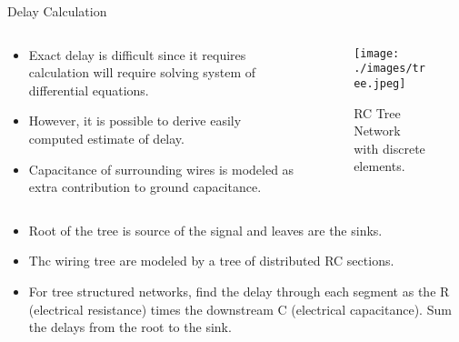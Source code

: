 \documentclass[10pt,sans,serif,trans]{beamer}
\begin{document}
\begin{frame}{Delay Calculation}
\begin{columns}[t] %
\begin{column}[T]{7cm} %
\begin{itemize}
  \item \color{red}Exact delay is difficult since it requires calculation will require solving
system of differential equations. \color{black}
    \item However, it is possible to derive easily computed estimate of delay.
     \item Capacitance of surrounding wires is modeled as extra contribution to ground capacitance.
   
 \end{itemize}
\end{column}

\begin{column}[T]{5 cm}
\begin{figure}[h]
\centering
\texttt{[image: ./images/tree.jpeg]}
\caption{RC Tree Network with discrete elements.}
\end{figure}
\end{column}
\end{columns}
\begin{itemize}
   \item Root of the tree is source of the signal and leaves are the sinks.
 \item Thc wiring tree are modeled by a tree of distributed RC sections.
\item For tree structured networks, find the delay through each segment
as the R (electrical resistance) times the downstream C (electrical capacitance). Sum the delays
from the root to the sink.
 
\end{itemize}

\end{frame}
\end{document}
